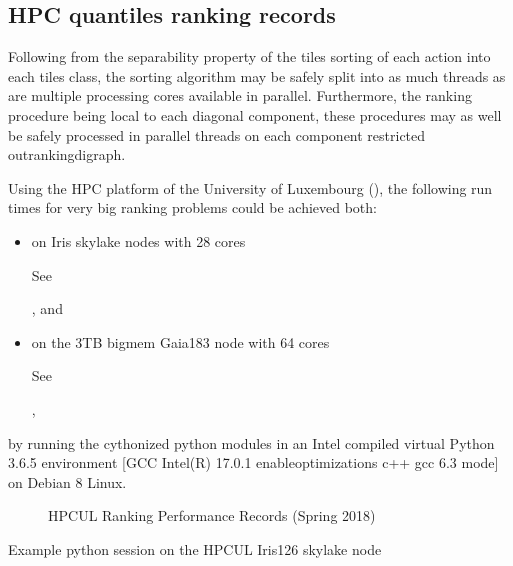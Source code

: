 \documentclass[a4paper,12pt,english]{sphinxhowto}
\let\sphinxpxdimen\pdfpxdimen\else\newdimen\sphinxpxdimen
\begin{document}
\subsection{HPC quantiles ranking records}
\label{\detokenize{tutorial:hpc-quantiles-ranking-records}}
Following from the separability property of the \sphinxhyphen{}tiles sorting of each action into each \sphinxhyphen{}tiles class, the \sphinxhyphen{}sorting algorithm may be safely split into as much threads as are multiple processing cores available in parallel. Furthermore, the ranking procedure being local to each diagonal component, these procedures may as well be safely processed in parallel threads on each component restricted outrankingdigraph.

Using the HPC platform of the University of Luxembourg (), the following run times for very big ranking problems could be achieved both:
\begin{itemize}
\item {} 
on Iris \sphinxhyphen{}skylake nodes with 28 cores %
\begin{footnote}[7]\sphinxAtStartFootnote
See 
%
\end{footnote}, and

\item {} 
on the 3TB \sphinxhyphen{}bigmem Gaia\sphinxhyphen{}183 node with 64 cores %
\begin{footnote}[8]\sphinxAtStartFootnote
See 
%
\end{footnote},

\end{itemize}

by running the cythonized python modules in an Intel compiled virtual Python 3.6.5 environment {[}GCC Intel(R) 17.0.1 \textendash{}enable\sphinxhyphen{}optimizations c++ gcc 6.3 mode{]} on Debian 8 Linux.

\begin{figure}[H]
\centering
\capstart

\noindent\sphinxincludegraphics[width=350\sphinxpxdimen]{{rankingRecords}.png}
\caption{HPC\sphinxhyphen{}UL Ranking Performance Records (Spring 2018)}\label{\detokenize{tutorial:id192}}\end{figure}

Example python session on the HPC\sphinxhyphen{}UL Iris\sphinxhyphen{}126 \sphinxhyphen{}skylake node \sphinxfootnotemark[7]
\end{document}

